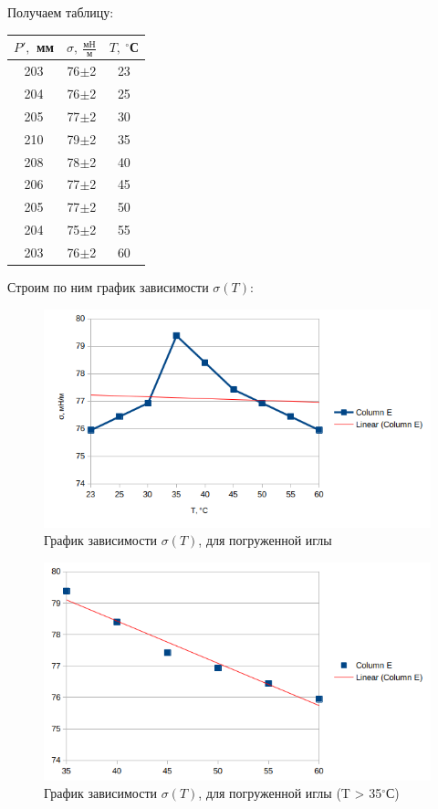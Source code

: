 \documentclass[a4paper,12pt]{article}
\theoremstyle{definition}
\begin{document}
	Получаем таблицу:
		\begin{table}[H]
			\bgroup
			\def\arraystretch{1.2}%
			
			\centering
			\begin{tabular}{|c|c|c|}
				\hline
				$P', $ мм&$\sigma,\: \frac{\text{мН}}{\text{м}}$& $T,\: ^\circ$С  \\
				\hline
				203 & 76$\pm$2 & 23 \\ \hline
				204 & 76$\pm$2 & 25 \\ \hline
				205 & 77$\pm$2 & 30 \\ \hline
				210 & 79$\pm$2 & 35 \\ \hline
				208 & 78$\pm$2 & 40 \\ \hline
				206 & 77$\pm$2 & 45 \\ \hline
				205 & 77$\pm$2 & 50 \\ \hline
				204 & 75$\pm$2 & 55 \\ \hline
				203 & 76$\pm$2 & 60 \\ \hline
			\end{tabular}

			\egroup
		\end{table}
	Строим по ним график зависимости $\sigma(T)$:
	\begin{figure}[H]
		\centering
		\includegraphics[scale = 0.55]{chart1.png}
		\caption{График зависимости $\sigma(T)$, для погруженной иглы}
		\label{graph1}
	\end{figure}



	\begin{figure}[H]
		\centering
		\includegraphics[scale = 0.55]{chart2.png}
		\caption{График зависимости $\sigma(T)$, для погруженной иглы (T > 35$^\circ$С)}
		\label{graph1}
	\end{figure}
\end{document}
